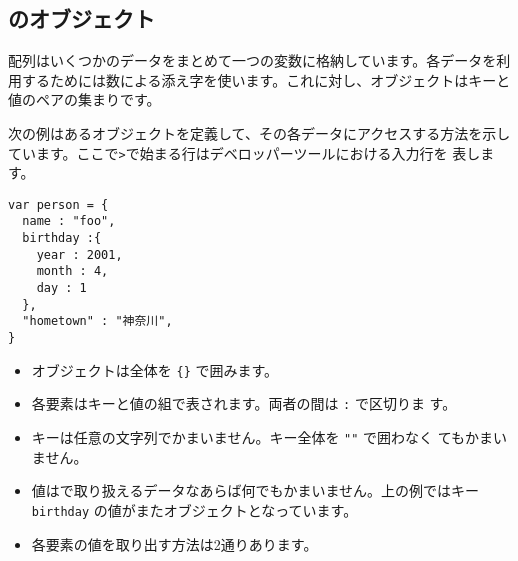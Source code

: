 \subsection{\JS のオブジェクト}
配列はいくつかのデータをまとめて一つの変数に格納しています。各データを利
用するためには数による添え字を使います。これに対し、オブジェクトはキーと
値のペアの集まりです。

次の例はあるオブジェクトを定義して、その各データにアクセスする方法を示し
ています。ここで\texttt{>}で始まる行はデベロッパーツールにおける入力行を
表します。
\begin{Verbatim}
var person = {
  name : "foo",
  birthday :{
    year : 2001,
    month : 4,
    day : 1
  },
  "hometown" : "神奈川",
}
\end{Verbatim}
\begin{itemize}
 \item オブジェクトは全体を \Verb+{}+ で囲みます。
 \item 各要素はキーと値の組で表されます。両者の間は \Verb+:+ で区切りま
			 す。
 \item キーは任意の文字列でかまいません。キー全体を \Verb+""+ で囲わなく
			 てもかまいません。
 \item 値は\JS で取り扱えるデータなあらば何でもかまいません。上の例ではキー
       \Verb+birthday+ の値がまたオブジェクトとなっています。
 \item 各要素の値を取り出す方法は2通りあります。


\end{itemize}
